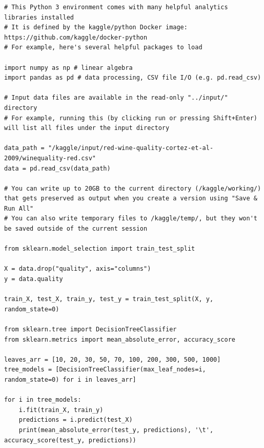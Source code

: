 \documentclass[12pt]{ctexart}
\begin{document}
    \begin{verbatim}
# This Python 3 environment comes with many helpful analytics libraries installed
# It is defined by the kaggle/python Docker image: https://github.com/kaggle/docker-python
# For example, here's several helpful packages to load

import numpy as np # linear algebra
import pandas as pd # data processing, CSV file I/O (e.g. pd.read_csv)

# Input data files are available in the read-only "../input/" directory
# For example, running this (by clicking run or pressing Shift+Enter) will list all files under the input directory

data_path = "/kaggle/input/red-wine-quality-cortez-et-al-2009/winequality-red.csv"
data = pd.read_csv(data_path)

# You can write up to 20GB to the current directory (/kaggle/working/) that gets preserved as output when you create a version using "Save & Run All" 
# You can also write temporary files to /kaggle/temp/, but they won't be saved outside of the current session

from sklearn.model_selection import train_test_split

X = data.drop("quality", axis="columns")
y = data.quality

train_X, test_X, train_y, test_y = train_test_split(X, y, random_state=0)

from sklearn.tree import DecisionTreeClassifier
from sklearn.metrics import mean_absolute_error, accuracy_score

leaves_arr = [10, 20, 30, 50, 70, 100, 200, 300, 500, 1000]
tree_models = [DecisionTreeClassifier(max_leaf_nodes=i, random_state=0) for i in leaves_arr]

for i in tree_models:
    i.fit(train_X, train_y)
    predictions = i.predict(test_X)
    print(mean_absolute_error(test_y, predictions), '\t', accuracy_score(test_y, predictions))
    \end{verbatim}
\end{document}
